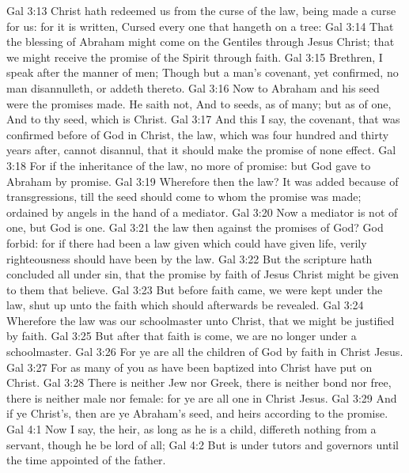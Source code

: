 \vs Gal 3:13 Christ hath redeemed us from the curse of the law, being made a curse for us: for it is written, Cursed  every one that hangeth on a tree:
\vs Gal 3:14 That the blessing of Abraham might come on the Gentiles through Jesus Christ; that we might receive the promise of the Spirit through faith.
\vs Gal 3:15 Brethren, I speak after the manner of men; Though  but a man's covenant, yet  confirmed, no man disannulleth, or addeth thereto.
\vs Gal 3:16 Now to Abraham and his seed were the promises made. He saith not, And to seeds, as of many; but as of one, And to thy seed, which is Christ.
\vs Gal 3:17 And this I say,  the covenant, that was confirmed before of God in Christ, the law, which was four hundred and thirty years after, cannot disannul, that it should make the promise of none effect.
\vs Gal 3:18 For if the inheritance  of the law,  no more of promise: but God gave  to Abraham by promise.
\vs Gal 3:19 Wherefore then  the law? It was added because of transgressions, till the seed should come to whom the promise was made;  ordained by angels in the hand of a mediator.
\vs Gal 3:20 Now a mediator is not  of one, but God is one.
\vs Gal 3:21  the law then against the promises of God? God forbid: for if there had been a law given which could have given life, verily righteousness should have been by the law.
\vs Gal 3:22 But the scripture hath concluded all under sin, that the promise by faith of Jesus Christ might be given to them that believe.
\vs Gal 3:23 But before faith came, we were kept under the law, shut up unto the faith which should afterwards be revealed.
\vs Gal 3:24 Wherefore the law was our schoolmaster  unto Christ, that we might be justified by faith.
\vs Gal 3:25 But after that faith is come, we are no longer under a schoolmaster.
\vs Gal 3:26 For ye are all the children of God by faith in Christ Jesus.
\vs Gal 3:27 For as many of you as have been baptized into Christ have put on Christ.
\vs Gal 3:28 There is neither Jew nor Greek, there is neither bond nor free, there is neither male nor female: for ye are all one in Christ Jesus.
\vs Gal 3:29 And if ye  Christ's, then are ye Abraham's seed, and heirs according to the promise.
\vs Gal 4:1 Now I say,  the heir, as long as he is a child, differeth nothing from a servant, though he be lord of all;
\vs Gal 4:2 But is under tutors and governors until the time appointed of the father.
